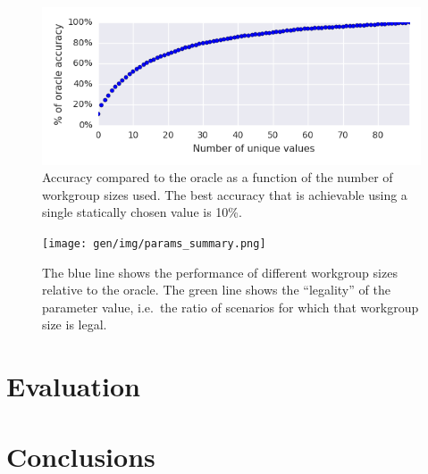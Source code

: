 \begin{figure}
\centering
\includegraphics{gen/img/num_param_oracle.png}
\caption{%
  Accuracy compared to the oracle as a function of the number of
  workgroup sizes used. The best accuracy that is achievable using a
  single statically chosen value is 10\%.%
}
\label{fig:oracle-accuracy}
\end{figure}

\begin{figure}
\centering
\texttt{[image: gen/img/params\_summary.png]}
\caption{%
  The blue line shows the performance of different workgroup sizes
  relative to the oracle. The green line shows the ``legality'' of the
  parameter value, i.e.\ the ratio of scenarios for which that
  workgroup size is legal.%
}
\end{figure}

\section{Evaluation}


\section{Conclusions}


